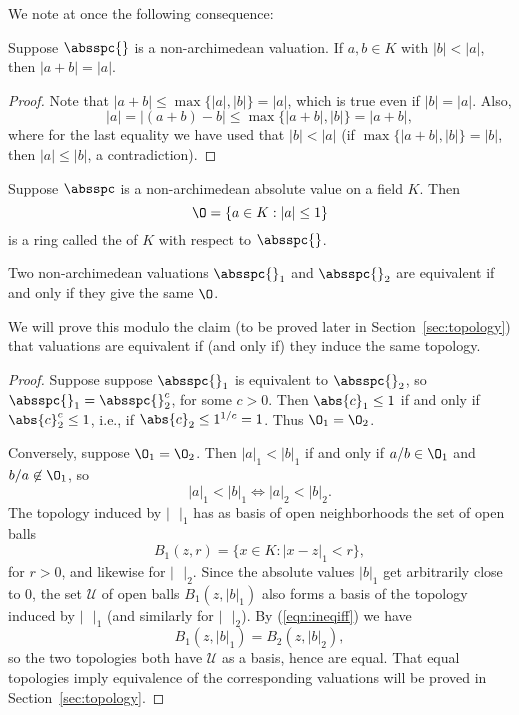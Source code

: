\documentclass[11pt]{book}
\begin{document}
\begin{ch}
We note at once the following consequence:
\begin{lemma}
Suppose $\absspc{}$ is a non-archimedean valuation.
If $a,b\in K$ with $|b|<|a|$, then
$
 |a+b|=|a|.
$
\end{lemma}
\begin{proof}
Note that $|a+b|\leq \max\{|a|,|b|\} = |a|$, which
is true even if $|b|=|a|$.  Also,
$$
  |a| = |(a+b) - b| \leq \max\{|a+b|, |b|\} = |a+b|,
$$
where for the last equality we have used that $|b|<|a|$
(if $\max\{|a+b|,|b|\} = |b|$, then $|a|\leq |b|$,
a contradiction).

\end{proof}

\begin{definition}
Suppose $\absspc$ is a non-archimedean absolute
value on a  field $K$.  Then
$$
  \O = \{a\in K : |a|\leq 1\}
$$ is a ring called the  of $K$
with respect to $\absspc{}$.
\end{definition}

\begin{lemma}
Two non-archimedean valuations $\absspc{}_1$ and
$\absspc{}_2$ are equivalent if and only if they
give the same $\O$.
\end{lemma}
We will prove this modulo the claim (to
be proved later in Section~\ref{sec:topology}) that
valuations are equivalent if (and only if) they induce the
same topology.
\begin{proof}
Suppose suppose $\absspc{}_1$ is equivalent to
$\absspc{}_2$, so $\absspc{}_1 = \absspc{}_2^c$,
for some $c>0$.  Then $\abs{c}_1 \leq 1$ if and only if
$\abs{c}_2^c \leq 1$, i.e., if $\abs{c}_2 \leq 1^{1/c}=1$.
Thus $\O_1 = \O_2$.

Conversely, suppose $\O_1 = \O_2$.
Then $|a|_1<|b|_1$ if and only if $a/b\in \O_1$
and $b/a\not\in \O_1$, so
\begin{equation}\label{eqn:ineqiff}
  |a|_1<|b|_1 \iff |a|_2 < |b|_2.
\end{equation}
The topology induced by $|\mbox{ }|_1$ has as basis
of open neighborhoods the set of open balls
$$
 B_1(z,r) = \{x \in K : |x-z|_1<r \},
$$
for $r>0$, and likewise for $|\mbox{ }|_2$.  Since
the absolute values $|b|_1$ get arbitrarily close
to $0$, the set $\mathcal{U}$ of open balls $B_1(z,|b|_1)$ also
forms a  basis of the topology induced
by $|\mbox{ }|_1$ (and similarly for $|\mbox{ }|_2$).
By (\ref{eqn:ineqiff}) we have
$$
 B_1(z,|b|_1) = B_2(z,|b|_2),
$$
so the two topologies both have $\mathcal{U}$ as
a basis, hence are equal.  That equal topologies
imply equivalence of the corresponding valuations
will be proved in Section~\ref{sec:topology}.
\end{proof}


\end{ch}
\end{document}
